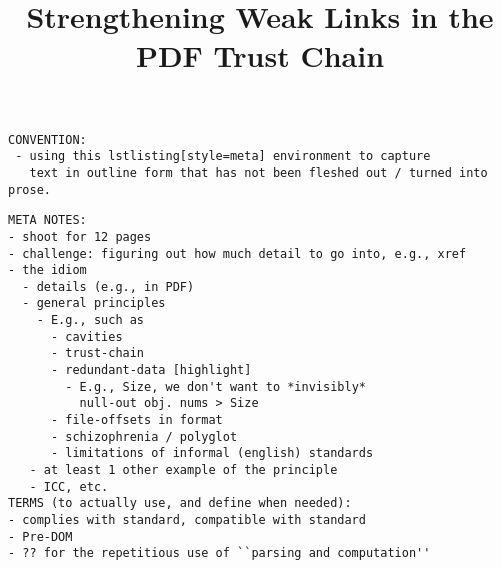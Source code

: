 \documentclass[conference,10pt]{IEEEtran}
\begin{document}
\date{}

\title{Strengthening Weak Links in the PDF Trust Chain}

\author{
     \and
}

\maketitle




\begin{lstlisting}[style=meta]
CONVENTION:
 - using this lstlisting[style=meta] environment to capture
   text in outline form that has not been fleshed out / turned into prose.
\end{lstlisting}

\begin{lstlisting}[style=meta]
META NOTES:  
- shoot for 12 pages
- challenge: figuring out how much detail to go into, e.g., xref
- the idiom
  - details (e.g., in PDF)
  - general principles
    - E.g., such as
      - cavities
      - trust-chain 
      - redundant-data [highlight]
        - E.g., Size, we don't want to *invisibly*
          null-out obj. nums > Size
      - file-offsets in format
      - schizophrenia / polyglot
      - limitations of informal (english) standards
   - at least 1 other example of the principle
   - ICC, etc.
TERMS (to actually use, and define when needed):
- complies with standard, compatible with standard
- Pre-DOM
- ?? for the repetitious use of ``parsing and computation''
\end{lstlisting}









\end{document}
